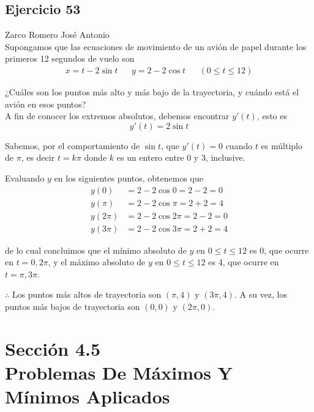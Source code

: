 \documentclass[12pt]{article}
\begin{document}
\subsection{Ejercicio 53} Zarco Romero José Antonio \\

Supongamos que las ecuaciones de movimiento de un avión de papel durante los primeros 12 segundos de vuelo son
\begin{align*}
  x=t-2\sin{t} && y=2-2\cos{t} && (0\leq t\leq 12)
\end{align*}

¿Cuáles son los puntos más alto y más bajo de la trayectoria, y cuándo está el avión en esos puntos? \\

A fin de conocer los extremos absolutos, debemos encontrar $y'(t)$, esto es
\[
y'(t)=2\sin{t}
\]

Sabemos, por el comportamiento de $\sin{t}$, que $y'(t)=0$ cuando $t$ es múltiplo de $\pi$, es decir $t=k\pi$ donde $k$ es un entero entre 0 y 3, inclusive.

Evaluando $y$ en los siguientes puntos, obtenemos que
\begin{align*}
  y(0)
  &= 2-2\cos{0} = 2-2 = 0 \\
  y(\pi)
  &= 2-2\cos{\pi} = 2+2 = 4\\
  y(2\pi)
  &= 2-2\cos{2\pi} = 2-2 = 0\\
  y(3\pi)
  &= 2-2\cos{3\pi} =  2+2 = 4
\end{align*}

de lo cual concluimos que el mínimo absoluto de $y$ en $0\leq t\leq 12$ es 0, que ocurre en $t=0,2\pi$, y el máximo absoluto de $y$ en $0\leq t\leq 12$ es 4, que ocurre en $t = \pi,3\pi$.

$\therefore $ Los puntos más altos de trayectoria son $(\pi,4)$ y $(3\pi,4)$. A su vez, los puntos más bajos de trayectoria son $(0,0)$ y $(2\pi,0)$.

\section{Sección 4.5 \\ Problemas De Máximos Y Mínimos Aplicados}
\end{document}
